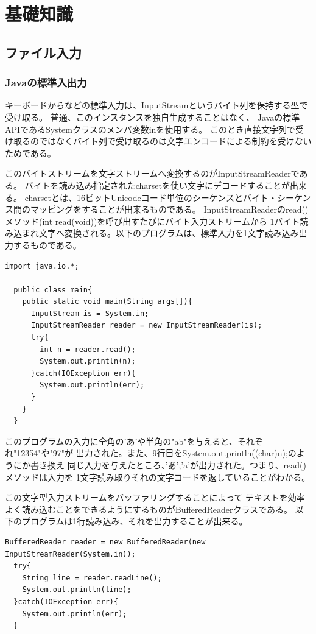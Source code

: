 \documentclass[dvipdfmx]{jsarticle}
\begin{document}
\section{基礎知識}
\subsection{ファイル入力}
\subsubsection{Javaの標準入出力}
キーボードからなどの標準入力は、InputStreamというバイト列を保持する型で受け取る。
普通、このインスタンスを独自生成することはなく、
Javaの標準APIであるSystemクラスのメンバ変数inを使用する。
このとき直接文字列で受け取るのではなくバイト列で受け取るのは文字エンコードによる制約を受けないためである。

このバイトストリームを文字ストリームへ変換するのがInputStreamReaderである。
バイトを読み込み指定されたcharsetを使い文字にデコードすることが出来る。
charsetとは、16ビットUnicodeコード単位のシーケンスとバイト・シーケンス間のマッピングをすることが出来るものである。
InputStreamReaderのread()メソッド(int read(void))を呼び出すたびにバイト入力ストリームから
1バイト読み込まれ文字へ変換される。以下のプログラムは、標準入力を1文字読み込み出力するものである。

\begin{lstlisting}[caption=1文字読み込み]
  import java.io.*;

  public class main{
    public static void main(String args[]){
      InputStream is = System.in;
      InputStreamReader reader = new InputStreamReader(is);
      try{
        int n = reader.read();
        System.out.println(n);
      }catch(IOException err){
        System.out.println(err);
      }
    }
  }
\end{lstlisting}

このプログラムの入力に全角の'あ'や半角の"ab"を与えると、それぞれ"12354"や"97"が
出力された。また、9行目をSystem.out.println((char)n);のようにか書き換え
同じ入力を与えたところ、'あ','a'が出力された。つまり、read()メソッドは入力を
1文字読み取りそれの文字コードを返していることがわかる。

この文字型入力ストリームをバッファリングすることによって
テキストを効率よく読み込むことをできるようにするものがBufferedReaderクラスである。
以下のプログラムは1行読み込み、それを出力することが出来る。

\begin{lstlisting}[caption=1行読み込み]
  BufferedReader reader = new BufferedReader(new InputStreamReader(System.in));
  try{
    String line = reader.readLine();
    System.out.println(line);
  }catch(IOException err){
    System.out.println(err);
  }
\end{lstlisting}
\end{document}
